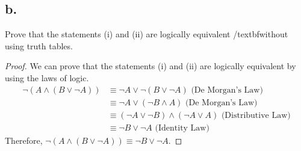 \documentclass{article}
\begin{document}
\subsection*{b.} Prove that the statements (i) and (ii) are logically equivalent /textbf{without} using truth tables.
\begin{proof}
    We can prove that the statements (i) and (ii) are logically equivalent by using the laws of logic. 
    \begin{align*}
        \lnot(A \land (B \lor \lnot A)) &\equiv \lnot A \lor \lnot(B \lor \lnot A) \text{ (De Morgan's Law)} \\
        &\equiv \lnot A \lor (\lnot B \land A) \text{ (De Morgan's Law)} \\
        &\equiv (\lnot A \lor \lnot B) \land (\lnot A \lor A) \text{ (Distributive Law)} \\
        &\equiv \lnot B \lor \lnot A \text{ (Identity Law)} 
    \end{align*}
    Therefore, $\lnot(A \land (B \lor \lnot A)) \equiv \lnot B \lor \lnot A$.
\end{proof}

    
\end{document}
